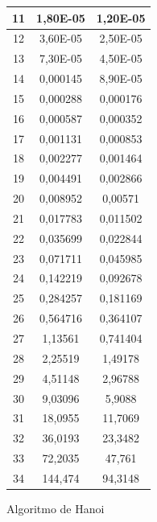 \documentclass[12pt,spanish]{article}
\begin{document}
\begin{figure}[H]
\begin{tabular}{|c|c|c|}
\hline
11 & 1,80E-05 & 1,20E-05\\
\hline
12 & 3,60E-05 & 2,50E-05\\
\hline
13 & 7,30E-05 & 4,50E-05\\
\hline
14 & 0,000145 & 8,90E-05\\
\hline
15 & 0,000288 & 0,000176\\
\hline
16 & 0,000587 & 0,000352\\
\hline
17 & 0,001131 & 0,000853\\
\hline
18 & 0,002277 & 0,001464\\
\hline
19 & 0,004491 & 0,002866\\
\hline
20 & 0,008952 & 0,00571\\
\hline
21 & 0,017783 & 0,011502\\
\hline
22 & 0,035699 & 0,022844\\
\hline
23 & 0,071711 & 0,045985\\
\hline
24 & 0,142219 & 0,092678\\
\hline
25 & 0,284257 & 0,181169\\
\hline
26 & 0,564716 & 0,364107\\
\hline
27 & 1,13561 & 0,741404\\
\hline
28 & 2,25519 & 1,49178\\
\hline
29 & 4,51148 & 2,96788\\
\hline
30 & 9,03096 & 5,9088\\
\hline
31 & 18,0955 & 11,7069\\
\hline
32 & 36,0193 & 23,3482\\
\hline
33 & 72,2035 & 47,761\\
\hline
34 & 144,474 & 94,3148\\
\hline
\end{tabular}
\caption{Algoritmo de Hanoi}
\end{figure}
\newpage
\end{document}
